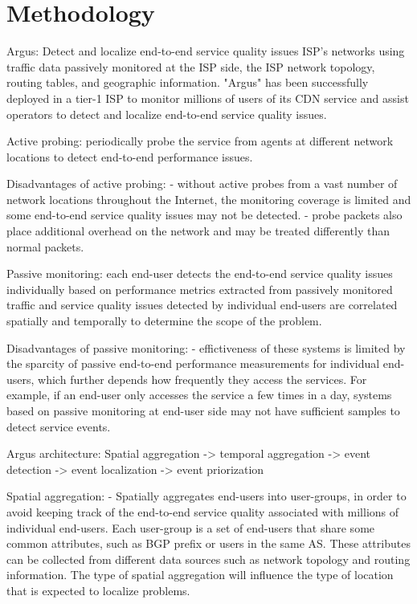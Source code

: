 \chapter{Methodology}

Argus:
Detect and localize end-to-end service quality issues ISP's networks using
traffic data passively monitored at the ISP side, the ISP network topology,
routing tables, and geographic information. "Argus" has been successfully
deployed in a tier-1 ISP to monitor millions of users of its CDN service and
assist operators to detect and localize end-to-end service quality issues.

Active probing: periodically probe the service from agents at different network
locations to detect end-to-end performance issues.

Disadvantages of active probing:
- without active probes from a vast number of network locations throughout the
Internet, the monitoring coverage is limited and some end-to-end service
quality issues may not be detected.
- probe packets also place additional overhead on the network and may be
treated differently than normal packets.

Passive monitoring: each end-user detects the end-to-end service quality issues
individually based on performance metrics extracted from passively monitored
traffic and service quality issues detected by individual end-users are
correlated spatially and temporally to determine the scope of the problem.

Disadvantages of passive monitoring:
- effictiveness of these systems is limited by the sparcity of passive
end-to-end performance measurements for individual end-users, which further
depends how frequently they access the services. For example, if an end-user
only accesses the service a few times in a day, systems based on passive
monitoring at end-user side may not have sufficient samples to detect service
events.

Argus architecture:
Spatial aggregation -> temporal aggregation -> event detection -> event
localization -> event priorization

Spatial aggregation:
- Spatially aggregates end-users into user-groups, in order to avoid keeping
track of the end-to-end service quality associated with millions of individual
end-users. Each user-group is a set of end-users that share some common
attributes, such as BGP prefix or users in the same AS. These attributes can be
collected from different data sources such as network topology and routing
information. The type of spatial aggregation will influence the type of
location that is expected to localize problems.

